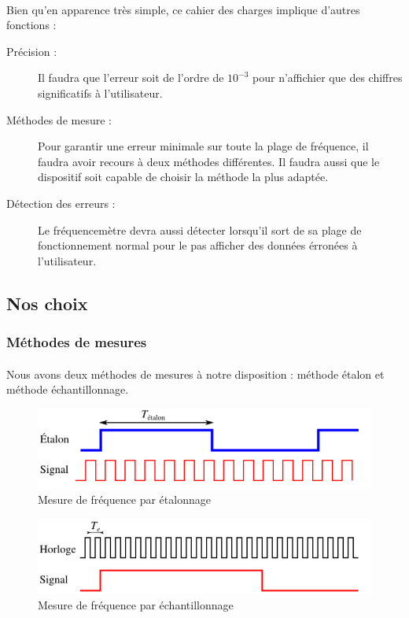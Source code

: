 \documentclass[a4paper,11pt]{article}
\begin{document}
\paragraph{}Bien qu'en apparence très simple, ce cahier des charges implique d'autres fonctions :
\begin{description}
\item[Précision : ] Il faudra que l'erreur soit de l'ordre de $10^{-3}$ pour n'affichier que des chiffres significatifs
à l'utilisateur.
\item[Méthodes de mesure : ] Pour garantir une erreur minimale sur toute la plage de fréquence, il faudra avoir recours
à deux méthodes différentes. Il faudra aussi que le dispositif soit capable de choisir la méthode la plus adaptée. 
\item[Détection des erreurs : ] Le fréquencemètre devra aussi détecter lorsqu'il sort de sa plage de 
fonctionnement normal pour le pas afficher des données érronées à l'utilisateur.
\end{description}


\subsection{Nos choix}
\subsubsection{Méthodes de mesures}
  \paragraph{} Nous avons deux méthodes de mesures à notre disposition : méthode étalon et méthode échantillonnage.

  \begin{figure}[H]
  \begin{center}
	  \includegraphics[scale=.4]{etalon.png}
	  \caption{Mesure de fréquence par étalonnage}
  \end{center}
  \end{figure}

  \begin{figure}[H]
  \begin{center}
	  \includegraphics[scale=.4]{ech.png}
	  \caption{Mesure de fréquence par échantillonnage}
  \end{center}
  \end{figure}
\end{document}
